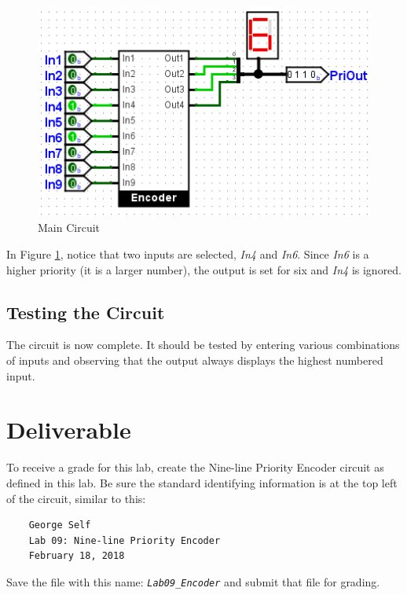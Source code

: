 \begin{figure}[H]
	\centering
	\includegraphics[width=\maxwidth{.95\linewidth}]{gfx/encode-06}
	\caption{Main Circuit}
	\label{fig:encode-06}
\end{figure}

In Figure \ref{fig:encode-06}, notice that two inputs are selected, \textit{In4} and \textit{In6}. Since \textit{In6} is a higher priority (it is a larger number), the output is set for six and \textit{In4} is ignored.

\subsection{Testing the Circuit}

The circuit is now complete. It should be tested by entering various combinations of inputs and observing that the output always displays the highest numbered input. 

\section{Deliverable}

To receive a grade for this lab, create the Nine-line Priority Encoder circuit as defined in this lab. Be sure the standard identifying information is at the top left of the circuit, similar to this:

\bigskip
\begin{minipage}{\linewidth}
	\begin{verbatim}
	George Self
	Lab 09: Nine-line Priority Encoder
	February 18, 2018
	\end{verbatim}
\end{minipage}
\bigskip

Save the file with this name: \emph{\texttt{Lab09\_Encoder}} and submit that file for grading.
